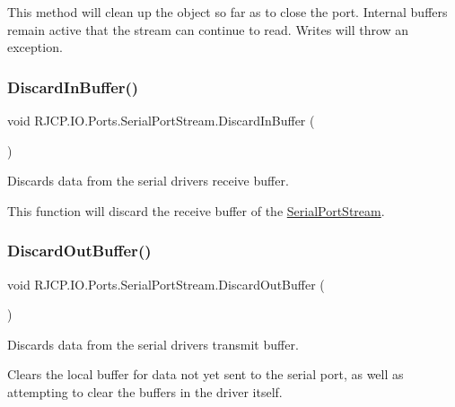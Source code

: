 This method will clean up the object so far as to close the port. Internal buffers remain active that the stream can continue to read. Writes will throw an exception. \mbox{\label{class_r_j_c_p_1_1_i_o_1_1_ports_1_1_serial_port_stream_ada46a03b060dbdf15e8f6f4bf8f8fc73}} 
\subsubsection{\texorpdfstring{DiscardInBuffer()}{DiscardInBuffer()}}
{\footnotesize\ttfamily void R\+J\+C\+P.\+I\+O.\+Ports.\+Serial\+Port\+Stream.\+Discard\+In\+Buffer (\begin{DoxyParamCaption}{ }\end{DoxyParamCaption})}



Discards data from the serial driver\textquotesingle{}s receive buffer. 

This function will discard the receive buffer of the \mbox{\hyperlink{class_r_j_c_p_1_1_i_o_1_1_ports_1_1_serial_port_stream}{Serial\+Port\+Stream}}. \mbox{\label{class_r_j_c_p_1_1_i_o_1_1_ports_1_1_serial_port_stream_ae46fd933ae0a74c420b6a65fffb0b882}} 
\subsubsection{\texorpdfstring{DiscardOutBuffer()}{DiscardOutBuffer()}}
{\footnotesize\ttfamily void R\+J\+C\+P.\+I\+O.\+Ports.\+Serial\+Port\+Stream.\+Discard\+Out\+Buffer (\begin{DoxyParamCaption}{ }\end{DoxyParamCaption})}



Discards data from the serial driver\textquotesingle{}s transmit buffer. 

Clears the local buffer for data not yet sent to the serial port, as well as attempting to clear the buffers in the driver itself. \mbox{\label{class_r_j_c_p_1_1_i_o_1_1_ports_1_1_serial_port_stream_af7d3477d73f74ebbfd372a2a99d9c146}} 
